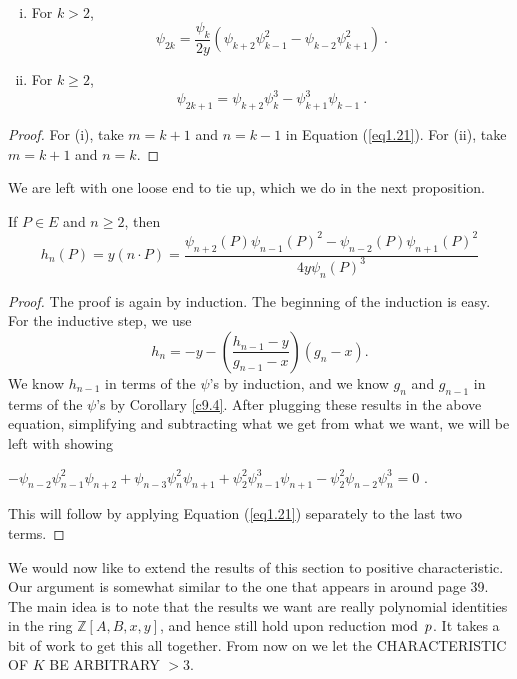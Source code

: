 \begin{coro}
\label{c9.6}
~
\begin{enumerate}[(i)]
\item
For $k>2$,
$$
\psi_{2k}=\frac{\psi_{k}}{2y}\left(\psi_{k+2}\psi_{k-1}^{2}-\psi_{k-2}\psi_{k+1}^{2}\right)\ .
$$
\item
For $k\geq 2$,
$$
\psi_{2k+1}=\psi_{k+2}\psi_{k}^{3}-\psi_{k+1}^{3}\psi_{k-1}\ .
$$
\end{enumerate}
\end{coro}

\begin{proof} For (i), take $m=k+1$ and $n=k-1$ in Equation (\ref{eq1.21}). For (ii), take $m=k+1$ and $n=k$.
\end{proof}
We are left with one loose end to tie up, which we do in the next proposition.

\begin{prop}
\label{p9.7}
If $P\in E$ and $n\geq 2$, then
\begin{equation}
\label{eq1.22}
h_{n}(P)=y(n \cdot P)=\frac{\psi_{n+2}(P)\psi_{n-1}(P)^{2}-\psi_{n-2}(P)\psi_{n+1}(P)^{2}}{4y\psi_{n}(P)^{3}}
\end{equation}
\end{prop}

\begin{proof}
The proof is again by induction. The beginning of the induction is easy. For the inductive step, we use
\begin{equation*}
h_{n}=-y-\left(\frac{h_{n-1}-y}{g_{n-1}-x}\right) (g_{n}-x) .
\end{equation*}
We know $h_{n-1}$ in terms of the $\psi$'s by induction, and we know $g_{n}$ and $g_{n-1}$ in terms of the $\psi$'s by Corollary \ref{c9.4}. After plugging these results in the above equation, simplifying and subtracting what we get from what we want, we will be left with showing

$-\psi_{n-2}\psi_{n-1}^{2}\psi_{n+2}+\psi_{n-3}\psi_{n}^{2}\psi_{n+1}+\psi_{2}^{2}\psi_{n-1}^{3}\psi_{n+1}-\psi_{2}^{2}
\psi_{n-2}\psi_{n}^{3}=0$ .

This will follow by applying Equation (\ref{eq1.21}) separately to the last two terms. 
\end{proof}

We would now like to extend the results of this section to positive characteristic. Our argument is somewhat similar to the one that appears in \cite{r1.3} around page 39. The main idea is to note that the results we want are really polynomial identities in the ring $\mathbb{Z}[A,B,x, y]$, and hence still hold upon reduction $\on{mod}\ p$. It takes a bit of work to get this all together. From now on we let the CHARACTERISTIC OF $K$ BE ARBITRARY $> 3$.

